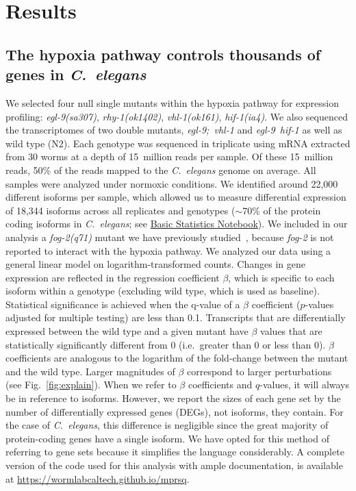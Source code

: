 \documentclass[9pt,twocolumn,twoside]{pnas-new}
\newcommand{\cel}{\emph{C.~elegans}}
\newcommand{\gene}[1]{\mbox{\emph{#1}}}
\begin{document}
\section*{Results}
\subsection*{The hypoxia pathway controls thousands of genes in \cel{}}
\label{sub:summary}

We selected four null single mutants within the hypoxia pathway for expression
profiling: \gene{egl-9(sa307)}, \gene{rhy-1(ok1402)}, \gene{vhl-1(ok161)},
\gene{hif-1(ia4)}. We also sequenced the transcriptomes of two double mutants,
\gene{egl-9; vhl-1} and \gene{egl-9 hif-1} as well as wild type (N2).
\color{purple}
Each genotype was sequenced in triplicate using mRNA extracted from 30 worms at
a depth of 15~million reads per sample. Of these 15~million reads, 50\% of the
reads mapped to the \cel{} genome on average. All samples were analyzed under
normoxic conditions.
\color{black}
We identified around 22,000 different isoforms per sample, which allowed us to
measure differential expression of 18,344 isoforms across all replicates and
genotypes ($\sim$70\% of the protein coding isoforms in \cel{}; see
\href{https://wormlabcaltech.github.io/mprsq/analysis_notebooks/1_basic_stats.html}
{Basic Statistics Notebook}). We included in our analysis a \gene{fog-2(q71)}
mutant we have previously studied~\cite{Angeles-Albores2017a}, because
\gene{fog-2} is not reported to interact with the hypoxia pathway. We analyzed
our data using a general linear model on logarithm-transformed counts. Changes
in gene expression are reflected in the regression coefficient $\beta$, which is
specific to each isoform within a genotype (excluding wild type, which is used
as baseline). Statistical significance is achieved when the q-value of a $\beta$
coefficient ($p$-values adjusted for multiple testing) are less than 0.1.
Transcripts that are differentially expressed between the wild type and a given
mutant have $\beta$ values that are statistically significantly different from 0
(i.e.\ greater than 0 or less than 0). $\beta$ coefficients are analogous to the
logarithm of the fold-change between the mutant and the wild type. Larger
magnitudes of $\beta$ correspond to larger perturbations (see
Fig.~\ref{fig:explain}). When we refer to $\beta$ coefficients and $q$-values,
it will always be in reference to isoforms. However, we report the sizes of each
gene set by the number of differentially expressed genes (DEGs), not isoforms,
they contain. For the case of \cel{}, this difference is negligible since the
great majority of protein-coding genes have a single isoform. We have opted for
this method of referring to gene sets because it simplifies the language
considerably. A complete version of the code used for this analysis with ample
documentation, is available at \url{https://wormlabcaltech.github.io/mprsq}.
\end{document}
